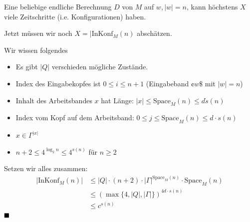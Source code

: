 \documentclass[a4paper, 11pt]{article}
\begin{document}
                            Eine beliebige endliche Berechnung $D$ von $M$ auf $w, |w| = n$, kann höchstens $X$ viele Zeitschritte (i.e. Konfigurationen) haben.
                        
                            Jetzt müssen wir noch $X = |\text{InKonf}_M(n)$ abschätzen.
                            
                            Wir wissen folgendes
                            \begin{itemize}[label=$\blacktriangleright$]
                                
                                \item Es gibt $|Q|$ verschieden mögliche Zustände.
                                
                                \item Index des Eingabekopfes ist $0 \leq i \leq n+1$ (Eingabeband $\cent w \$$ mit $|w| = n$)
                                
                                \item Inhalt des Arbeitsbandes $x$ hat Länge: $|x| \leq \text{Space}_M(n) \leq d \dot s(n)$
                                
                                \item Index vom Kopf auf dem Arbeitsband: $0 \leq j \leq \text{Space}_M(n) \leq d \cdot s(n)$
                                
                                \item $x \in \Gamma^{|x|}$
                                
                                \item $n + 2 \leq 4^{\log_2n}\leq 4^{s(n)}$ für $n \geq 2$
                            \end{itemize}
                        
                    
                            Setzen wir alles zusammen:
                            \begin{align*}
                                |\text{InKonf}_M(n)| &\leq |Q| \cdot (n + 2) \cdot |\Gamma|^{\text{Space}_M(n)}\cdot \text{Space}_M(n)\\
                                                    &\leq (\max\{4, |Q|, |\Gamma|\})^{4d \cdot s(n)}\\
                                                    &\leq c^{s(n)}
                            \end{align*}
                            $\hfill\blacksquare$
\end{document}
